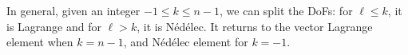 %
%

In general, given an integer $-1\leq k \leq n-1$, we can split the DoFs: for $\ell \leq k$, it is Lagrange and for $\ell > k$, it is N\'ed\'elec. It returns to the vector Lagrange element when $k = n-1$, and N\'ed\'elec element for $k=-1$.


